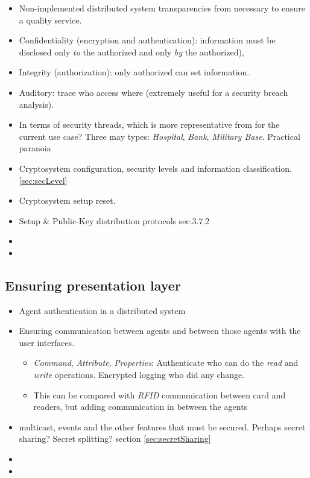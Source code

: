 \documentclass[10pt,a4paper,twoside]{llncs}
\begin{document}
\begin{itemize}
 \item Non-implemented distributed system transparencies from \cite{TanenbaumDistr} necessary to ensure a quality service.
 \item Confidentiality (encryption and authentication): information must be disclosed only \emph{to} the authorized and only \emph{by} the authorized),
 \item Integrity (authorization): only authorized can set information.
 \item Auditory: trace who access where (extremely useful for a security breach analysis).
 \item In terms of security threads, which is more representative from \cite{SecEngRossAnderson} for the current use case? Three may types: \emph{Hospital}, \emph{Bank}, \emph{Military Base}. Practical paranoia \cite{PractCryptoSchneier}
 \item Cryptosystem configuration, security levels and information classification. \ref{sec:secLevel}
 \item Cryptosystem setup reset.
 \item Setup \& Public-Key distribution protocols \cite{SecEngRossAnderson} sec.3.7.2
 \item 
 \item 
\end{itemize}

%
\subsection{Ensuring presentation layer \label{sec:presentationLayer}}

\begin{itemize}
 \item Agent authentication in a distributed system
 \item Ensuring communication between agents and between those agents with the user interfaces.
 \begin{itemize}
  \item \emph{Command}, \emph{Attribute}, \emph{Properties}: Authenticate who can do the \emph{read} and \emph{write} operations. Encrypted logging who did any change.
  \item This can be compared with \emph{RFID} communication between card and readers, but adding communication in between the agents
 \end{itemize}
 \item multicast, events and the other features that must be secured. Perhaps secret sharing? Secret splitting? section \ref{sec:secretSharing}
 \item 
 \item 
\end{itemize}
\end{document}
